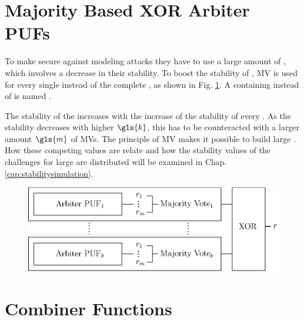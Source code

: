 
\section{Majority Based XOR Arbiter PUFs}
\label{sec:majorityxorarbiter}

To make \xpufs secure against modeling attacks they have to use a large amount of \apufs, which involves a decrease in their stability.
To boost the stability of \xpufs, \ac{MV} is used for every single \apuf instead of the complete \xpuf, as shown in Fig. \ref{fig:majorityxorarbiter}.
A \xpuf containing \mpufs instead of \apufs is named \mxpuf.

The stability of the \xpuf increases with the increase of the stability of every \mpuf.
As the stability decreases with higher $\gls{k}$, this has to be counteracted with a larger amount $\gls{m}$ of \acp{MV}.
The principle of \ac{MV} makes it possible to build large \mxpufs. %
How these competing values are relate and how the stability values of the challenges for large \mxpufs are distributed will be examined in Chap. \ref{cap:stabilitysimulation}.

\begin{figure}[ht]
\centering
\includegraphics[width=1.00\textwidth]{images/majority_xor_arbiter_v2.eps}
\caption[Majority \acs{XOR} \apuf]{\mxpuf}
\label{fig:majorityxorarbiter}
\end{figure}


\section{Combiner Functions}
\label{sec:combinerfunctions}

